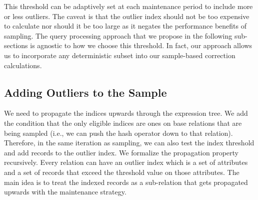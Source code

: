 This threshold can be adaptively set at each maintenance period to include more or less outliers.
The caveat is that the outlier index should not be too expensive to calculate nor should it be too large as it negates the performance benefits of sampling.  
The query processing approach that we propose in the following sub-sections is agnostic to how we choose this threshold.
In fact, our approach allows us to incorporate any deterministic subset into our sample-based correction calculations.

\subsection{Adding Outliers to the Sample}
We need to propagate the indices upwards through the expression tree.
We add the condition that the only eligible indices are ones on base relations that are being sampled (i.e., we can push the hash operator down to that relation).
Therefore, in the same iteration as sampling, we can also test the index threshold and add records to the outlier index. 
We formalize the propagation property recursively. 
Every relation can have an outlier index which is a set of attributes and a set of records that exceed the threshold value on those attributes.
The main idea is to treat the indexed records as a sub-relation that gets propagated upwards with the maintenance strategy.
